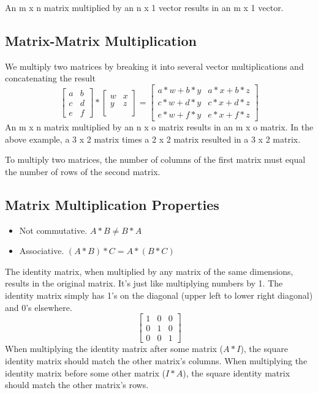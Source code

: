 An m x n matrix multiplied by an n x 1 vector results in an m x 1 vector.

\subsection*{Matrix-Matrix Multiplication}
We multiply two matrices by breaking it into several vector multiplications and concatenating the result
\[
\begin{bmatrix}  a & b \\   c & d \\   e & f \end{bmatrix} *\begin{bmatrix}  w & x \\   y & z \\  \end{bmatrix} =\begin{bmatrix}  a*w + b*y & a*x + b*z \\   c*w + d*y & c*x + d*z \\   e*w + f*y & e*x + f*z\end{bmatrix}
\]
An m x n matrix multiplied by an n x o matrix results in an m x o matrix. In the above example, a 3 x 2 matrix times a 2 x 2 matrix resulted in a 3 x 2 matrix.

To multiply two matrices, the number of columns of the first matrix must equal the number of rows of the second matrix.
\subsection*{Matrix Multiplication Properties}
\begin{itemize}
	\item Not commutative. $A\ast B\neq B\ast A$
	\item Associative. $(A\ast B)\ast C=A\ast (B\ast C)$
\end{itemize}
The identity matrix, when multiplied by any matrix of the same dimensions, results in the original matrix. It's just like multiplying numbers by 1. The identity matrix simply has 1's on the diagonal (upper left to lower right diagonal) and 0's elsewhere.
\[
\begin{bmatrix}
1 & 0 & 0 \\
0 & 1 & 0 \\
0 & 0 & 1 
\end{bmatrix}
\]
When multiplying the identity matrix after some matrix ($A\ast I$), the square identity matrix should match the other matrix's columns. When multiplying the identity matrix before some other matrix ($I\ast A$), the square identity matrix should match the other matrix's rows.
